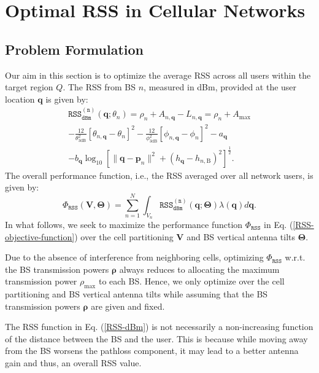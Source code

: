 \section{Optimal RSS in Cellular Networks}\label{RSS-Chapter}

\subsection{Problem Formulation}\label{RSS-Problem-Formulation}

Our aim in this section is to optimize the average RSS across all users within the target region $Q$. The RSS from BS $n$, measured in dBm, provided at the user location $\bm{q}$ is given by:
\begin{multline}\label{RSS-dBm}
\mathtt{RSS_{dBm}^{(n)}}(\bm{q}; \theta_n)= \rho_n + A_{n,\bm{q}} - L_{n,\bm{q}}
 = \rho_n + A_{\textrm{max}} \\ - \frac{12}{\theta^2_{\text{3dB}}} \left[ \theta_{n,\bm{q}} - \theta_n \right]^2 - \frac{12}{\phi^2_{\text{3dB}}} \left[ \phi_{n,\bm{q}} - \phi_n \right]^2 
  - a_{\bm{q}} \\ - b_{\bm{q}} \log_{10}\left[\| \bm{q} - \bm{p}_n \|^2 + (h_{\bm{q}} -h_{n,\mathrm{B}})^2 \right]^{\frac{1}{2}}.
\end{multline}
The overall performance function, i.e., the RSS averaged over all network users, is given by:
\begin{equation}\label{RSS-objective-function}
    \Phi_{\mathtt{RSS}}(\bm{V}, \bm{\Theta}) = \sum_{n=1}^{N} \int_{V_n} \mathtt{RSS_{dBm}^{(n)}}(\bm{q}; \bm{\Theta}) \lambda(\bm{q}) d\bm{q}.
\end{equation}
In what follows, we seek to maximize the performance function $\Phi_{\mathtt{RSS}}$ in Eq. (\ref{RSS-objective-function}) over the cell partitioning $\bm{V}$ and BS vertical antenna tilts $\bm{\Theta}$.

\begin{Remark}
Due to the absence of interference from neighboring cells, optimizing $\Phi_{\mathtt{RSS}}$ w.r.t. the BS transmission powers $\bm{\rho}$ always reduces to allocating the maximum transmission power $\rho_{\max}$ to each BS. Hence, we only optimize over the cell partitioning and BS vertical antenna tilts while assuming that the BS transmission powers $\bm{\rho}$ are given and fixed.
\end{Remark}

\begin{Remark}
The RSS function in Eq. (\ref{RSS-dBm}) is not necessarily a non-increasing function of the distance between the BS and the user. This is because while moving away from the BS worsens the pathloss component, it may lead to a better antenna gain and thus, an overall RSS value.
\end{Remark}





